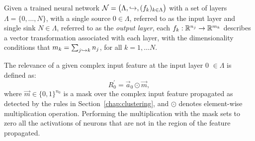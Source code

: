 Given a trained neural network $\mathcal{N}=\big(\Lambda,\hookrightarrow,(f_k)_{k\in \Lambda}\big)$ with a set of layers $\Lambda=\{0,\dots, N\}$, with a single source $0\in \Lambda$, referred to as the input layer and single sink $N\in \Lambda$, referred to as the \emph{output layer}, each $f_k:\mathbb{R}^{n_j}\to \mathbb{R}^{m_k}$ describes a vector transformation associated with each layer, with the dimensionality conditions that $m_k=\sum_{j\hookrightarrow k} n_j$, for all $k=1,\dots N$. 

The relevance of a given complex input feature at the input layer 0 $\in \Lambda$ is defined as:
\begin{equation*}
    R_0^\prime = \vec{a}_0 \odot \vec{m},
\end{equation*}
where $\vec{m}\in \{0,1\}^{n_0}$ is a mask over the complex input feature propagated as detected by the rules in Section~\ref{chap:clustering}, and $\odot$ denotes element-wise multiplication operation. Performing the multiplication with the mask sets to zero all the activations of neurons that are not in the region of the feature propagated.


